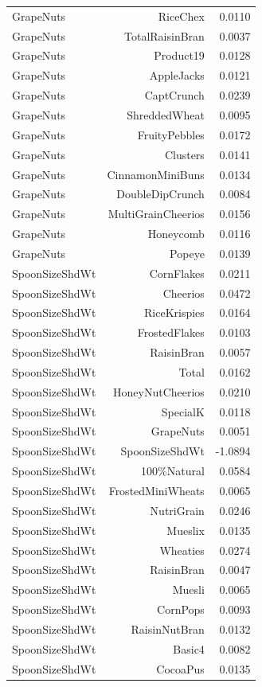 \begin{longtable}{@{}lrr@{}}
GrapeNuts & RiceChex & 0.0110 \\
GrapeNuts & TotalRaisinBran & 0.0037 \\
GrapeNuts & Product19 & 0.0128 \\
GrapeNuts & AppleJacks & 0.0121 \\
GrapeNuts & CaptCrunch & 0.0239 \\
GrapeNuts & ShreddedWheat & 0.0095 \\
GrapeNuts & FruityPebbles & 0.0172 \\
GrapeNuts & Clusters & 0.0141 \\
GrapeNuts & CinnamonMiniBuns & 0.0134 \\
GrapeNuts & DoubleDipCrunch & 0.0084 \\
GrapeNuts & MultiGrainCheerios & 0.0156 \\
GrapeNuts & Honeycomb & 0.0116 \\
GrapeNuts & Popeye & 0.0139 \\
SpoonSizeShdWt & CornFlakes & 0.0211 \\
SpoonSizeShdWt & Cheerios & 0.0472 \\
SpoonSizeShdWt & RiceKrispies & 0.0164 \\
SpoonSizeShdWt & FrostedFlakes & 0.0103 \\
SpoonSizeShdWt & RaisinBran & 0.0057 \\
SpoonSizeShdWt & Total & 0.0162 \\
SpoonSizeShdWt & HoneyNutCheerios & 0.0210 \\
SpoonSizeShdWt & SpecialK & 0.0118 \\
SpoonSizeShdWt & GrapeNuts & 0.0051 \\
SpoonSizeShdWt & SpoonSizeShdWt & -1.0894 \\
SpoonSizeShdWt & 100\%Natural & 0.0584 \\
SpoonSizeShdWt & FrostedMiniWheats & 0.0065 \\
SpoonSizeShdWt & NutriGrain & 0.0246 \\
SpoonSizeShdWt & Mueslix & 0.0135 \\
SpoonSizeShdWt & Wheaties & 0.0274 \\
SpoonSizeShdWt & RaisinBran & 0.0047 \\
SpoonSizeShdWt & Muesli & 0.0065 \\
SpoonSizeShdWt & CornPops & 0.0093 \\
SpoonSizeShdWt & RaisinNutBran & 0.0132 \\
SpoonSizeShdWt & Basic4 & 0.0082 \\
SpoonSizeShdWt & CocoaPus & 0.0135 \\

\end{longtable}
